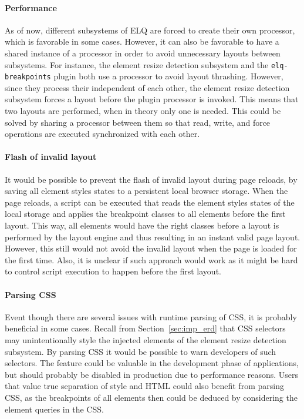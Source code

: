 \documentclass[a4paper,11pt]{kth-mag}
\newcommand{\code}[1]{\texttt{#1}}
\begin{document}
      \paragraph{Performance}
      As of now, different subsystems of \gls{ELQ} are forced to create their own  processor, which is favorable in some cases.
      However, it can also be favorable to have a shared instance of a  processor in order to avoid unnecessary layouts between subsystems.
      For instance, the element resize detection subsystem and the \code{elq-breakpoints} plugin both use a  processor to avoid \gls{layout thrashing}.
      However, since they process their  independent of each other, the element resize detection subsystem forces a layout before the plugin  processor is invoked.
      This means that two layouts are performed, when in theory only one is needed.
      This could be solved by sharing a  processor between them so that read, write, and force operations are executed synchronized with each other.

      \paragraph{Flash of invalid layout}
      It would be possible to prevent the flash of invalid layout during page reloads, by saving all element styles states to a persistent local \gls{browser} storage.
      When the page reloads, a script can be executed that reads the element styles states of the local storage and applies the breakpoint classes to all \glspl{element} before the first layout.
      This way, all \glspl{element} would have the right classes before a layout is performed by the \gls{layout engine} and thus resulting in an instant valid page layout.
      However, this still would not avoid the invalid layout when the page is loaded for the first time.
      Also, it is unclear if such approach would work as it might be hard to control script execution to happen before the first layout.

      \paragraph{Parsing CSS}
      Event though there are several issues with runtime parsing of CSS, it is probably beneficial in some cases.
      Recall from Section~\ref{sec:imp_erd} that CSS selectors may unintentionally style the injected \glspl{element} of the element resize detection subsystem.
      By parsing CSS it would be possible to warn developers of such selectors.
      The feature could be valuable in the development phase of applications, but should probably be disabled in production due to performance reasons.
      Users that value true separation of style and \gls{HTML} could also benefit from parsing CSS, as the breakpoints of all \glspl{element} then could be deduced by considering the element queries in the CSS.
\end{document}
